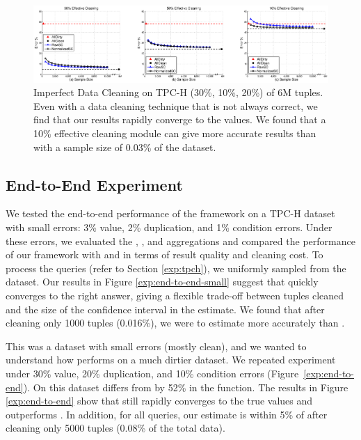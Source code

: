 \begin{figure}[t]\vspace{-1em}
\centering
\hspace*{-2.5em}\includegraphics[scale=0.31]{exp/imperfect-cleaning-samplesize.eps}\vspace{-1em}
\caption{Imperfect Data Cleaning on TPC-H (30\%, 10\%, 20\%) of 6M tuples. 
Even with a data cleaning technique that is not always correct, we find that our results rapidly converge to the \allclean values.
We found that a 10\% effective cleaning module can give more accurate results than \alldirty with a sample size of 0.03\% of the dataset.}
\label{exp:imperfect}\vspace{-1em}
\end{figure}



\subsection{End-to-End Experiment}\label{subsec:end-to-end}
We tested the end-to-end performance of the \saqpplus framework on a TPC-H dataset with small errors: 3\% value, 2\% duplication, and 1\% condition errors.
Under these errors, we evaluated the \avgfunc, \sumfunc, and \countfunc aggregations and compared the performance of our framework with \allclean and \alldirty in terms of result quality and cleaning cost.
To process the queries (refer to Section \ref{exp:tpch}), we uniformly sampled from the dataset.
Our results in Figure \ref{exp:end-to-end-small} suggest that \saqpplus quickly converges to the right answer, giving a flexible trade-off between tuples cleaned and the size of the confidence interval in the estimate.
We found that after cleaning only 1000 tuples (0.016\%), we were to estimate more accurately than \alldirty.



This was a dataset with small errors (mostly clean), and we wanted to understand how \saqpplus performs on a much dirtier dataset.
We repeated experiment under 30\% value, 20\% duplication, and 10\% condition errors (Figure~\ref{exp:end-to-end}).
On this dataset \alldirty differs from \allclean by 52\% in the \avgfunc function.
The results in Figure \ref{exp:end-to-end} show that \sampleclean still rapidly converges to the true values and outperforms \alldirty.
In addition, for all queries, our estimate is within 5\% of \allclean after cleaning only 5000 tuples (0.08\% of the total data).

